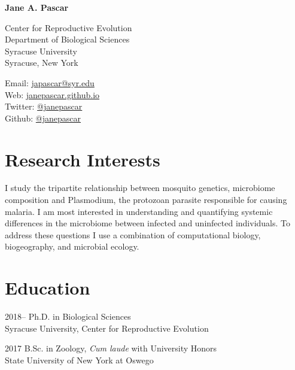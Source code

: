 \documentclass[12pt,letterpaper]{report}
\newcommand{\myname}{Jane A. Pascar}
\newcommand{\namefont}[1]{{\normalfont\bfseries\Huge{#1}}}
\newcommand{\listitemspace}{0.15em}
\renewenvironment{itemize}
{\begin{list}{}{\setlength{\leftmargin}{0em}
            \setlength{\parskip}{0em}
            \setlength{\itemsep}{\listitemspace}
            \setlength{\parsep}{\listitemspace}}}
    {\end{list}}
\begin{document}
    \raggedright

    \namefont{\myname}

    \vspace{1em}
    \begin{minipage}[t]{0.68\textwidth}
        Center for Reproductive Evolution \\
        Department of Biological Sciences \\
        Syracuse University
        \\Syracuse, New York
    \end{minipage}
    \begin{minipage}[t]{0.31\textwidth}
        Email: \href{mailto:japascar@syr.edu}{japascar@syr.edu} \\
        Web: \href{http://janepascar.github.io}{janepascar.github.io} \\
        Twitter: \href{https://twitter.com/janepascar}{@janepascar} \\
        Github: \href{https://github.com/janepascar}{@janepascar}
    \end{minipage}
    \vspace{0.5em}
    
    
    
    \section*{Research Interests}

    \begin{itemize}

        \item I study the tripartite relationship between mosquito genetics, microbiome composition and Plasmodium, the protozoan parasite responsible for causing malaria. I am most interested in understanding and quantifying systemic differences in the microbiome between infected and uninfected individuals. To address these questions I use a combination of computational biology, biogeography, and microbial ecology.


    \end{itemize}


    \section*{Education}

    \begin{tablist}

        \item[2018--] \tab Ph.D. in Biological Sciences \\
        				   Syracuse University, Center for Reproductive Evolution
        
        \item[2017] \tab B.Sc. in Zoology,  \textit{Cum laude} with University Honors \\
        			     State University of New York at Oswego

    \end{tablist}
\end{document}
